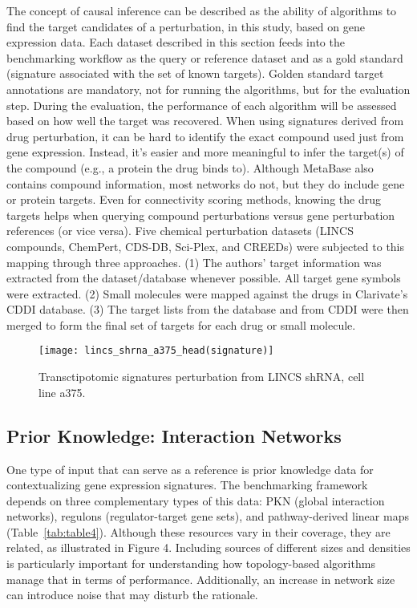 The concept of causal inference can be described as the ability of algorithms to find the target candidates of a perturbation, in this study, based on gene expression data. Each dataset described in this section feeds into the benchmarking workflow as the query or reference dataset and as a gold standard (signature associated with the set of known targets). Golden standard target annotations are mandatory, not for running the algorithms, but for the evaluation step. During the evaluation, the performance of each algorithm will be assessed based on how well the target was recovered. When using signatures derived from drug perturbation, it can be hard to identify the exact compound used just from gene expression. Instead, it's easier and more meaningful to infer the target(s) of the compound (e.g., a protein the drug binds to). Although MetaBase also contains compound information, most networks do not, but they do include gene or protein targets. Even for connectivity scoring methods, knowing the drug targets helps when querying compound perturbations versus gene perturbation references (or vice versa). Five chemical perturbation datasets (LINCS compounds, ChemPert, CDS-DB, Sci-Plex, and CREEDs) were subjected to this mapping through three approaches. (1) The authors' target information was extracted from the dataset/database whenever possible. All target gene symbols were extracted. (2) Small molecules were mapped against the drugs in Clarivate's CDDI database. (3) The target lists from the database and from CDDI were then merged to form the final set of targets for each drug or small molecule.


\begin{figure}[htbp]
    \centering
    \texttt{[image: lincs\_shrna\_a375\_head(signature)]}
    \caption{Transctipotomic signatures perturbation from LINCS shRNA, cell line a375.}
    \label{fig:example_signatures}
\end{figure}



\subsection{Prior Knowledge: Interaction Networks} %
\label{sec:prior_knowledge_interaction_networks}

One type of input that can serve as a reference is prior knowledge data for contextualizing gene expression signatures. 
The benchmarking framework depends on three complementary types of this data: 
PKN (global interaction networks), regulons (regulator-target gene sets), and pathway-derived linear maps (Table~\ref{tab:table4}). 
Although these resources vary in their coverage, they are related, as illustrated in Figure 4. Including sources of different 
sizes and densities is particularly important for understanding how topology-based algorithms manage that in terms of performance. 
Additionally, an increase in network size can introduce noise that may disturb the rationale. 


